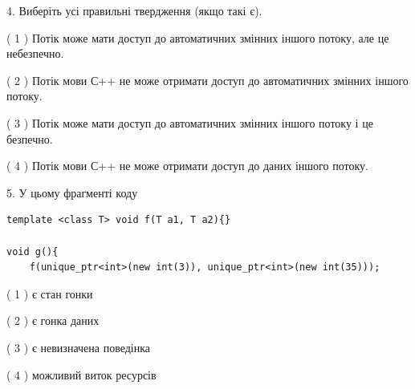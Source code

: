 \documentclass[12pt, ukrainian]{article}
\begin{document}
\begin {large}
{%
4. Виберіть усі правильні твердження (якщо такі є).\par
\vspace{2mm}

( 1 ) Потік може мати доступ до автоматичних змінних іншого потоку, але це небезпечно.%

( 2 ) Потік мови С++ не може отримати доступ до автоматичних змінних іншого потоку.%

( 3 ) Потік може мати доступ до автоматичних змінних іншого потоку і це безпечно.%

( 4 ) Потік мови С++ не може отримати доступ до даних іншого потоку.%


5. У цьому фрагменті коду
\begin{verbatim}
template <class T> void f(T a1, T a2){}

void g(){
    f(unique_ptr<int>(new int(3)), unique_ptr<int>(new int(35)));
\end{verbatim}

( 1 ) є стан гонки%

( 2 ) є гонка даних%

( 3 ) є невизначена поведінка%

( 4 ) можливий виток ресурсів%
}
\end {large}
\end{document}
